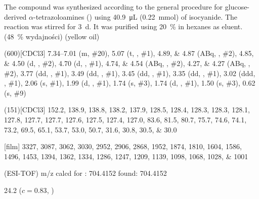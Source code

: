 The compound was synthesized according to the general procedure for glucose-derived $\alpha$-tetrazoloamines () using \SI{40.9}{\micro\liter} (\SI{0.22}{\milli\mol}) of  isocyanide.
The reaction was stirred for \SI{3}{\day}.
It was purified using \SI{20}{\percent}  in hexanes as eluent.
(\SI{48}{\percent} wydajności) (yellow oil)
\begin{fullexp}
	\NMR(600)[CDCl3] \numrange{7.34}{7.01} (m, \#{20}), \num{5.07} (t, , \#{1}), \numlist{4.89;4.87} (ABq, , \#{2}), \numlist{4.85;4.50} (d, , \#{2}), \num{4.70} (d, , \#{1}), \numlist{4.74;4.54} (ABq, , \#{2}), \numlist{4.27;4.27} (ABq, , \#{2}), \num{3.77} (dd, , \#{1}), \num{3.49} (dd, , \#{1}), \num{3.45} (dd, , \#{1}), \num{3.35} (dd, , \#{1}), \num{3.02} (ddd, , \#{1}), \num{2.06} (s, \#{1}), \num{1.99} (d, , \#{1}), \num{1.74} (s, \#{3}), \num{1.74} (d, , \#{1}), \num{1.50} (s, \#{3}), \num{0.62} (s, \#{9})\par\noindent
	(151)[CDCl3] \numlist{152.2; 138.9; 138.8; 138.2; 137.9; 128.5; 128.4; 128.3; 128.3; 128.1; 127.8; 127.7; 127.7; 127.6; 127.5; 127.4; 127.0; 83.6; 81.5; 80.7; 75.7; 74.6; 74.1; 73.2; 69.5; 65.1; 53.7; 53.0; 50.7; 31.6; 30.8; 30.5; 30.0}\par\noindent
	[film] \numlist{3327; 3087; 3062; 3030; 2952; 2906; 2868; 1952; 1874; 1810; 1604; 1586; 1496; 1453; 1394; 1362; 1334; 1286; 1247; 1209; 1139; 1098; 1068; 1028; 1001}\par\noindent
	 (ESI-TOF) m/z calcd for : \num{704.4152} found: \num{704.4152}\par\noindent
	\data{[$\alpha^{23}_D$]~$=$} \num{24.2} ($c = 0.83$, )
\end{fullexp}

